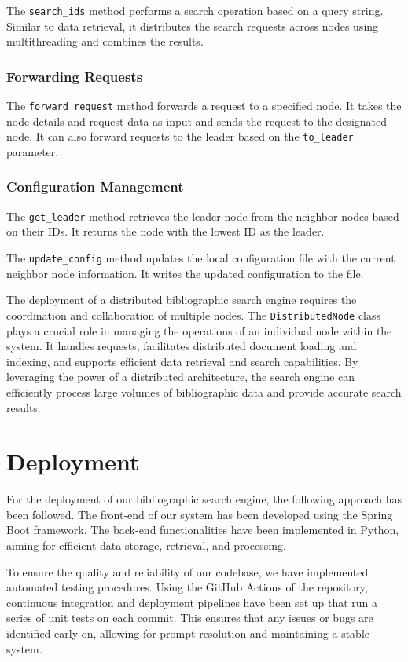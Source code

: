 \documentclass{article}
\begin{document}
The \texttt{search\_ids} method performs a search operation based on a query string. Similar to 
data retrieval, it distributes the search requests across nodes using multithreading and 
combines the results.

\subsubsection*{Forwarding Requests}

The \texttt{forward\_request} method forwards a request to a specified node. It takes the node 
details and request data as input and sends the request to the designated node. It can also 
forward requests to the leader based on the \texttt{to\_leader} parameter.

\subsubsection*{Configuration Management}

The \texttt{get\_leader} method retrieves the leader node from the neighbor nodes based on their 
IDs. It returns the node with the lowest ID as the leader.


The \texttt{update\_config} method updates the local configuration file with the current 
neighbor node information. It writes the updated configuration to the file.


The deployment of a distributed bibliographic search engine requires the coordination and 
collaboration of multiple nodes. The \texttt{DistributedNode} class plays a crucial role in 
managing the operations of an individual node within the system. It handles requests, 
facilitates distributed document loading and indexing, and supports efficient data retrieval and 
search capabilities. By leveraging the power of a distributed architecture, the search engine 
can efficiently process large volumes of bibliographic data and provide accurate search results.

\section{Deployment}
For the deployment of our bibliographic search engine, the following approach has been followed.
The front-end of our system has been developed using the Spring Boot framework.
The back-end functionalities have been implemented in Python, aiming for efficient data storage, 
retrieval, and processing. 

To ensure the quality and reliability of our codebase, we have implemented automated testing 
procedures. Using the GitHub Actions of the repository, 
continuous integration and deployment pipelines have been set up that run a series of unit tests 
on each commit. This ensures that any issues or bugs are identified early on, allowing for 
prompt resolution and maintaining a stable system.
\end{document}
